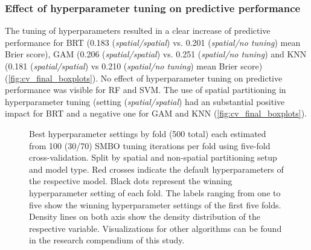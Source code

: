 \documentclass[review]{elsarticle}
\begin{document}
\subsubsection{Effect of hyperparameter tuning on predictive performance}
The tuning of hyperparameters resulted in a clear increase of predictive performance for BRT (0.183 (\emph{spatial/spatial}) vs. 0.201 (\emph{spatial/no tuning}) mean Brier score), GAM (0.206 (\emph{spatial/spatial}) vs. 0.251 (\emph{spatial/no tuning}) and KNN (0.181 (\emph{spatial/spatial}) vs 0.210 (\emph{spatial/no tuning}) mean Brier score) (\autoref{fig:cv_final_boxplots}).
No effect of hyperparameter tuning on predictive performance was visible for RF and SVM.
The use of spatial partitioning in hyperparameter tuning (setting (\emph{spatial/spatial}) had an substantial positive impact for BRT and a negative one for GAM and KNN (\autoref{fig:cv_final_boxplots}).

\begin{figure} [H]
	\begin{center}
		\caption[]{Best hyperparameter settings by fold (500 total) each estimated from 100 (30/70) SMBO tuning iterations per fold using five-fold cross-validation.
		Split by spatial and non-spatial partitioning setup and model type.
			Red crosses indicate the default hyperparameters of the respective model.
			Black dots represent the winning hyperparameter setting of each fold.
			The labels ranging from one to five show the winning hyperparameter settings of the first five folds.
			Density lines on both axis show the density distribution of the respective variable.
			Visualizations for other algorithms can be found in the research compendium of this study.}
		\label{fig:best_parameter_combs}
	\end{center}
\end{figure}
\end{document}

